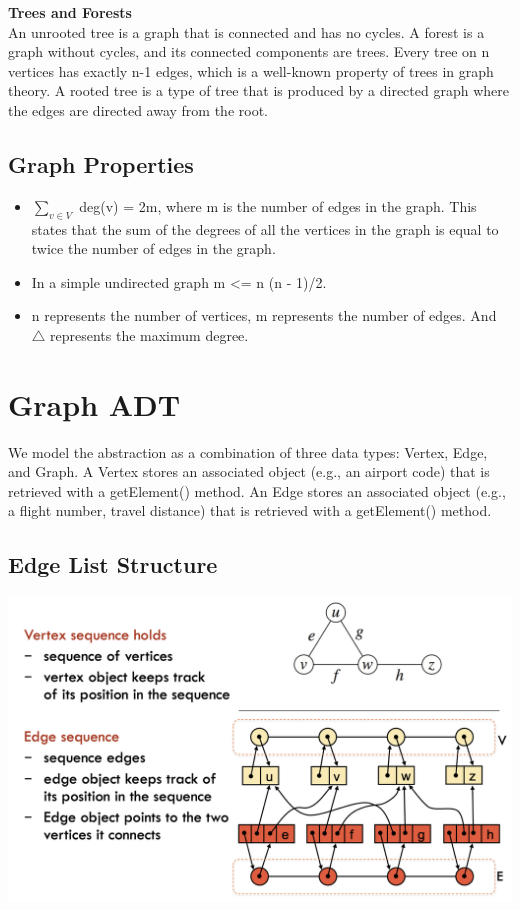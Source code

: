 \documentclass[12pt]{article}
\newcommand{\1}{\space \quad}
\newcommand{\2}{\quad \quad \quad}
\newcommand{\3}{\quad \quad \quad \quad \space}
\newcommand{\4}{\quad \quad \quad \quad \quad \quad}
\newcommand{\5}{\quad \quad \quad \quad \quad \quad \quad \space}
\begin{document}
\vspace{10pt}
\textbf{Trees and Forests}\\
An unrooted tree is a graph that is connected and has no cycles. A forest is a graph without cycles, and its connected components 
are trees. Every tree on n vertices has exactly n-1 edges, which is a well-known property of trees in graph theory. A rooted 
tree is a type of tree that is produced by a directed graph where the edges are directed away from the root.

\subsection{Graph Properties}
\begin{itemize}
  \item $\sum_{v \in V}$ deg(v) = 2m, where m is the number of edges in the graph. This states that the sum of the 
  degrees of all the vertices in the graph is equal to twice the number of edges in the graph.
  \item In a simple undirected graph m <= n (n - 1)/2.
  \item n represents the number of vertices, m represents the number of edges. And $\triangle$ represents the maximum degree.
\end{itemize}

\section{Graph ADT}
We model the abstraction as a combination of three data types: Vertex, Edge, and Graph.
A Vertex stores an associated object (e.g., an airport code) that is retrieved with a getElement() method.
An Edge stores an associated object (e.g., a flight number, travel distance) that is retrieved with a getElement() method. 

\subsection{Edge List Structure}
\includegraphics[width=\textwidth]{image13.png}
\end{document}
